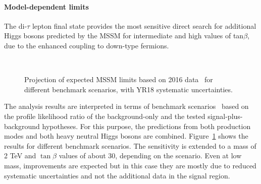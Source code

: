 \paragraph{Model-dependent limits}
\label{sec:model_dep}
The di-$\tau$ lepton final state provides the most sensitive direct search for additional
Higgs bosons predicted by the MSSM for intermediate and high values of tan$\beta$, due to the enhanced
coupling to down-type fermions.
%
\begin{figure}[htbp]
\begin{center}
\\
\end{center}
\caption{Projection of expected MSSM \htt limits based on 2016 data~\cite{HIG-17-020} for different benchmark scenarios, with YR18 systematic uncertainties.}
\label{fig:model_mssm1}
\end{figure}

The analysis results are interpreted in terms of benchmark scenarios~\cite{Carena:2013ytb} based on the profile likelihood ratio of the 
background-only and the tested signal-plus-background hypotheses. 
For this purpose, the predictions from both production modes and both heavy neutral Higgs bosons are combined.
Figure~\ref{fig:model_mssm1} shows the results 
for different benchmark scenarios. The sensitivity is extended to a mass of 
2 TeV and $\tan \beta$ values of about 30, depending on the scenario. 
Even at low mass, improvements are expected but in this case they are mostly due to reduced systematic uncertainties and not 
the additional data in the signal region.
